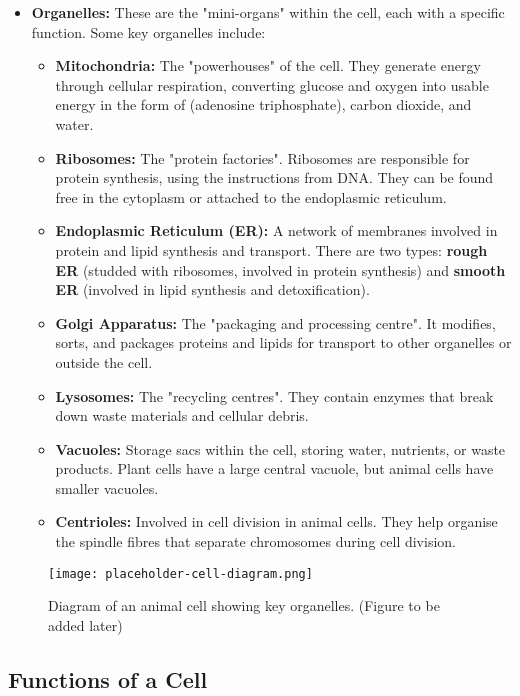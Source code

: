 \begin{itemize}
    \item \textbf{Organelles:} These are the "mini-organs" within the cell, each with a specific function.  Some key organelles include:
        \begin{itemize}
            \item \textbf{Mitochondria:}  The "powerhouses" of the cell. They generate energy through cellular respiration, converting glucose and oxygen into usable energy in the form of  (adenosine triphosphate), carbon dioxide, and water. 
            \item \textbf{Ribosomes:}  The "protein factories". Ribosomes are responsible for protein synthesis, using the instructions from DNA. They can be found free in the cytoplasm or attached to the endoplasmic reticulum.
            \item \textbf{Endoplasmic Reticulum (ER):} A network of membranes involved in protein and lipid synthesis and transport. There are two types: \textbf{rough ER} (studded with ribosomes, involved in protein synthesis) and \textbf{smooth ER} (involved in lipid synthesis and detoxification).
            \item \textbf{Golgi Apparatus:} The "packaging and processing centre". It modifies, sorts, and packages proteins and lipids for transport to other organelles or outside the cell.
            \item \textbf{Lysosomes:} The "recycling centres". They contain enzymes that break down waste materials and cellular debris.
            \item \textbf{Vacuoles:} Storage sacs within the cell, storing water, nutrients, or waste products. Plant cells have a large central vacuole, but animal cells have smaller vacuoles.
            \item \textbf{Centrioles:}  Involved in cell division in animal cells. They help organise the spindle fibres that separate chromosomes during cell division.
        \end{itemize}
\end{itemize}

\begin{figure}[htbp]
    \centering
    \texttt{[image: placeholder-cell-diagram.png]}
    \caption{Diagram of an animal cell showing key organelles. (Figure to be added later)}
    \label{fig:animalcell}
\end{figure}

\subsection{Functions of a Cell}

